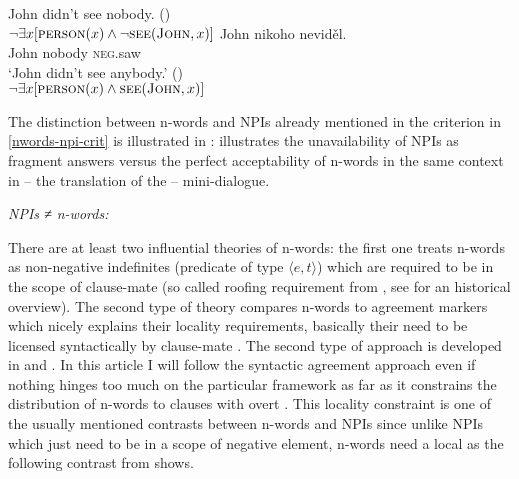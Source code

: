 \documentclass[output=paper, colorlinks, citecolor=brown, newtxmath]{langsci/langscibook}
\begin{document}
\ea\label{ex-4} \ea\label{ex-4-a} John didn't see nobody. \hfill ()\\
$\neg \exists x[\textsc{person}(x) \wedge \neg \textsc{see}(\textsc{John},x)]$
\ex \label{ex-4-b}\gll  John nikoho neviděl.\\
John nobody \textsc{neg}.saw\\
\glt `John didn't see anybody.' \hfill ()\\
$\neg \exists x[\textsc{person}(x) \wedge \textsc{see}(\textsc{John},x)]$
\z
\z

\newpage
\noindent The distinction between n-words and NPIs already mentioned in the criterion in \ref{nwords-npi-crit} is illustrated in :  illustrates the unavailability of NPIs as fragment answers versus the perfect acceptability of n-words in the same context in  -- the  translation of the  --  mini-dialogue.

\ea \textit{NPIs ≠ n-words:}\label{ex-5}
\label{ex-5-b}
\z
\z

\noindent There are at least two influential theories of n-words: the first one treats n-words as non-negative indefinites (predicate of type $\langle e,t\rangle$) which are required to be in the scope of clause-mate  (so called roofing requirement from \cite{ladusaw1992expressing}, see \cite{giannakidou1997landscape} for an historical overview). The second type of theory compares n-words to agreement markers which nicely explains their locality requirements, basically their need to be licensed syntactically by clause-mate . The second type of approach is developed in  \cite{zeijlstra2004sentential} and \cite{zeijlstra2008negative}. In this article I will follow the syntactic agreement approach even if nothing hinges too much on the particular framework as far as it constrains the distribution of n-words to clauses with overt . This locality constraint is one of the usually mentioned contrasts between n-words and NPIs since unlike  NPIs which just need to be in a scope of negative element, n-words need a local  as the following contrast from \cite{giannakidou2017landscape} shows.
\end{document}
